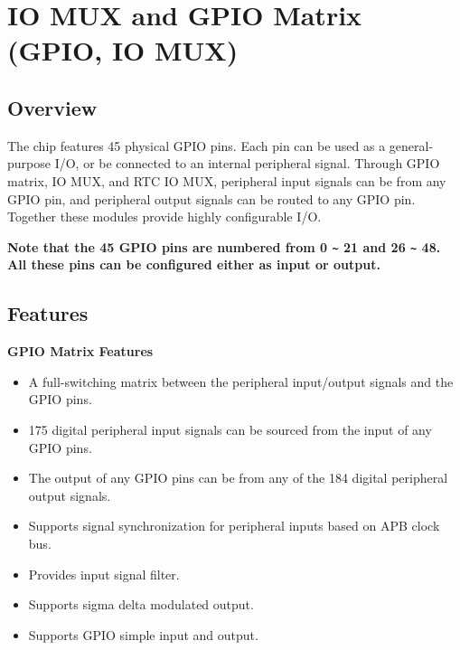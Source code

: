 \documentclass[main\_\_EN.tex]{subfiles}
\begin{document}

\ifglobal
\else
    {\let\clearpage\relax \listoftodos}
    \tableofcontents
\fi



\hypertarget{iomuxgpio}{}
\chapter{IO MUX and GPIO Matrix (GPIO, IO MUX)}
\label{mod:iomuxgpio}

\section{Overview}

The \chipname{} chip features 45 physical GPIO pins. Each pin can be used as a general-purpose I/O, or be connected to an internal peripheral signal. Through GPIO matrix, IO MUX, and RTC IO MUX, peripheral input signals can be from any GPIO pin, and peripheral output signals can be routed to any GPIO pin. Together these modules provide highly configurable I/O.

{\bfseries Note that the 45 GPIO pins are numbered from 0 \verb+~+ 21 and 26 \verb+~+ 48. All these pins can be configured either as input or output.}


\section{Features}

\textbf{GPIO Matrix Features}

\begin{itemize}
\item A full-switching matrix between the peripheral input/output signals and the GPIO pins. 
\item 175 digital peripheral input signals can be sourced from the input of any GPIO pins. 
\item The output of any GPIO pins can be from any of the 184 digital peripheral output signals. 
\item Supports signal synchronization for peripheral inputs based on APB clock bus.
\item Provides input signal filter.
\item Supports sigma delta modulated output.
\item Supports GPIO simple input and output.
\end{itemize}
\end{document}
